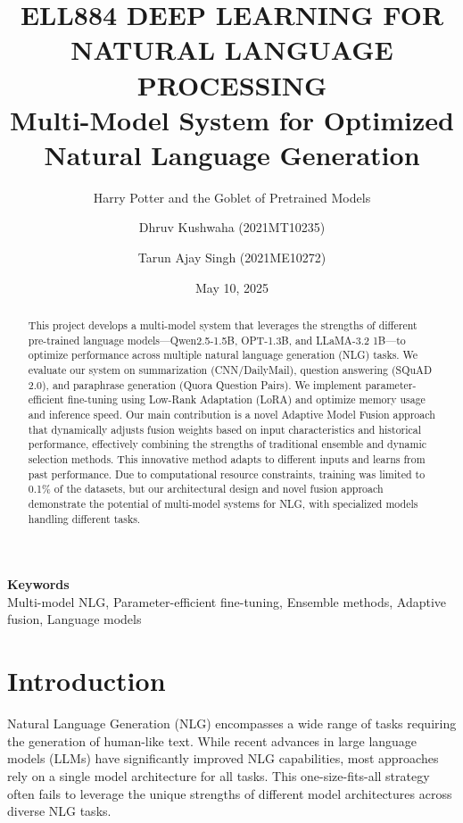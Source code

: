 \documentclass[10pt,twocolumn,letterpaper]{article}
\title{
    \usefont{OT1}{bch}{b}{n}
    \normalfont \normalsize \textsc{ELL884 DEEP LEARNING FOR NATURAL LANGUAGE PROCESSING} \\ [10pt]
    \huge Multi-Model System for Optimized Natural Language Generation \\
}
\author[1]{Harry Potter and the Goblet of Pretrained Models}
\author[1]{Dhruv Kushwaha (2021MT10235)}
\author[1]{Tarun Ajay Singh (2021ME10272)}
\affil[1]{\small{Sem-II, 2024-25}}
\date{May 10, 2025}
\begin{document}
\maketitle

\begin{abstract}
This project develops a multi-model system that leverages the strengths of different pre-trained language models—Qwen2.5-1.5B, OPT-1.3B, and LLaMA-3.2 1B—to optimize performance across multiple natural language generation (NLG) tasks. We evaluate our system on summarization (CNN/DailyMail), question answering (SQuAD 2.0), and paraphrase generation (Quora Question Pairs). We implement parameter-efficient fine-tuning using Low-Rank Adaptation (LoRA) and optimize memory usage and inference speed. Our main contribution is a novel Adaptive Model Fusion approach that dynamically adjusts fusion weights based on input characteristics and historical performance, effectively combining the strengths of traditional ensemble and dynamic selection methods. This innovative method adapts to different inputs and learns from past performance. Due to computational resource constraints, training was limited to 0.1\% of the datasets, but our architectural design and novel fusion approach demonstrate the potential of multi-model systems for NLG, with specialized models handling different tasks.
\end{abstract}

{\textbf{Keywords} \\
Multi-model NLG, Parameter-efficient fine-tuning, Ensemble methods, Adaptive fusion, Language models}

\section{Introduction}

Natural Language Generation (NLG) encompasses a wide range of tasks requiring the generation of human-like text. While recent advances in large language models (LLMs) have significantly improved NLG capabilities, most approaches rely on a single model architecture for all tasks. This one-size-fits-all strategy often fails to leverage the unique strengths of different model architectures across diverse NLG tasks.
\end{document}

